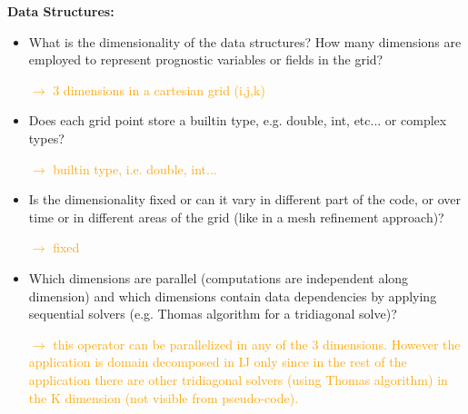 \documentclass[a4paper,10pt]{scrartcl}
\begin{document}
\textbf{Data Structures:}\newline
\begin{itemize}
	\item What is the dimensionality of the data structures? How many dimensions are employed to represent prognostic variables or fields in the grid?
	
	\textcolor{orange}{$\rightarrow$ 3 dimensions in a cartesian grid (i,j,k)}
	
	\item Does each grid point store a builtin type, e.g. double, int, etc... or complex types?
	
	\textcolor{orange}{$\rightarrow$ builtin type, i.e. double, int...}
	
	\item Is the dimensionality fixed or can it vary in different part of the code, or over time or in different areas of the grid (like in a mesh refinement approach)?
	
	\textcolor{orange}{$\rightarrow$ fixed}
	
	\item Which dimensions are parallel (computations are independent along dimension) and which dimensions contain data dependencies by applying sequential solvers (e.g. Thomas algorithm for a tridiagonal solve)?
	
	\textcolor{orange}{$\rightarrow$ this operator can be parallelized in any of the 3 dimensions. However the application is domain decomposed in IJ only since in the rest of the application there are other tridiagonal solvers (using Thomas algorithm) in the K dimension (not visible from pseudo-code).} 
	
\end{itemize}
\end{document}
